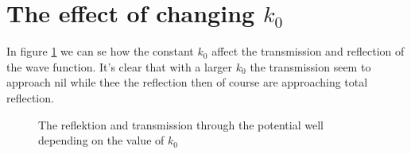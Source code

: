 \documentclass[11pt]{article}
\newlength\figureheight
\newlength\figurewidth
\begin{document}
\section{The effect of changing $k_0$}
In figure \ref{fig:k0} we can se how the constant $k_0$ affect the transmission and reflection of the wave function. It's clear that with a larger $k_0$ the transmission seem to approach nil while thee the reflection then of course are approaching total reflection.
\begin{figure}[H]
	\centering
	\setlength{}
	\setlength{}
	
	\caption{The reflektion and transmission through the potential well depending on the value of $k_0$}
	\label{fig:k0}
\end{figure}
\end{document}
